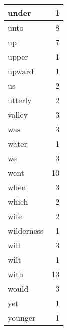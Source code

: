 \begin{center}
\begin{longtable}{l|r}
under & 1 \\ \hline
unto & 8 \\ \hline
up & 7 \\ \hline
upper & 1 \\ \hline
upward & 1 \\ \hline
us & 2 \\ \hline
utterly & 2 \\ \hline
valley & 3 \\ \hline
was & 3 \\ \hline
water & 1 \\ \hline
we & 3 \\ \hline
went & 10 \\ \hline
when & 3 \\ \hline
which & 2 \\ \hline
wife & 2 \\ \hline
wilderness & 1 \\ \hline
will & 3 \\ \hline
wilt & 1 \\ \hline
with & 13 \\ \hline
would & 3 \\ \hline
yet & 1 \\ \hline
younger & 1 \\ \hline
\end{longtable}
\end{center}



\normalsize



